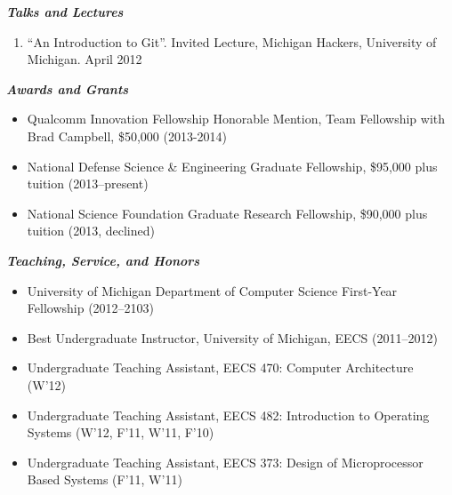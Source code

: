 \documentclass{article}
\begin{document}
{\bf {\em Talks and Lectures}}

\begin{enumerate}

\item ``An Introduction to Git''. Invited Lecture, Michigan Hackers,
University of Michigan. April 2012

\end{enumerate}

{\bf {\em Awards and Grants}}

\begin{itemize}

  \item Qualcomm Innovation Fellowship Honorable Mention, Team Fellowship with
    Brad Campbell, \$50,000 (2013-2014)
  \item National Defense Science \& Engineering Graduate Fellowship, \$95,000 plus tuition (2013--present)
  \item National Science Foundation Graduate Research Fellowship, \$90,000 plus tuition (2013, declined)

\end{itemize}

{\bf {\em Teaching, Service, and Honors}}

\begin{itemize}

\item University of Michigan Department of Computer Science First-Year Fellowship (2012--2103)
\item Best Undergraduate Instructor, University of Michigan, EECS (2011--2012)
\item Undergraduate Teaching Assistant, EECS 470: Computer Architecture (W'12)
\item Undergraduate Teaching Assistant, EECS 482: Introduction to Operating Systems (W'12, F'11, W'11, F'10)
\item Undergraduate Teaching Assistant, EECS 373: Design of Microprocessor Based Systems (F'11, W'11)

\end{itemize}
\end{document}
